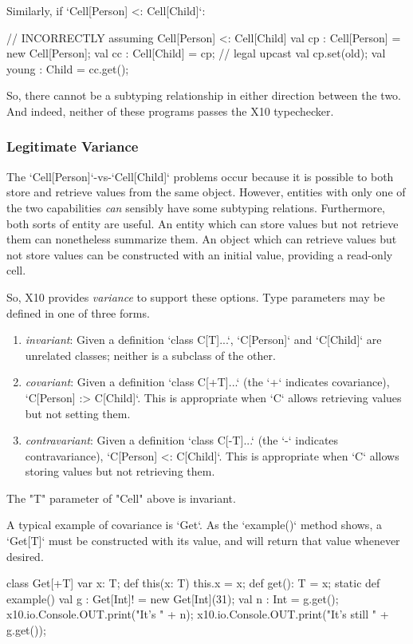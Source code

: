 {Similarly, if \xcd`Cell[Person] <: Cell[Child]`: 
\begin{xten}
// INCORRECTLY assuming Cell[Person] <: Cell[Child]
val cp : Cell[Person] = new Cell[Person];
val cc : Cell[Child] = cp; // legal upcast
val cp.set(old); 
val young : Child = cc.get();
\end{xten}

So, there cannot be a subtyping relationship in either direction between the
two. And indeed, neither of these programs passes the X10 typechecker.


\subsubsection{Legitimate Variance}

The \xcd`Cell[Person]`-vs-\xcd`Cell[Child]` problems occur because it is
possible to both store and retrieve values from the same object. However,
entities with only one of the two capabilities {\em can} sensibly have some
subtyping relations. Furthermore, both sorts of entity are useful. An entity
which can store values but not retrieve them can nonetheless summarize them.
An object which can retrieve values but not store values can be constructed
with an initial value, providing a read-only cell.

So, X10 provides {\em variance} to support these options.  Type parameters
may be defined in one of three forms.  
\begin{enumerate}
\item {\em invariant}: Given a definition \xcd`class C[T]{...}`, \xcd`C[Person]` and
      \xcd`C[Child]` are unrelated classes; neither is a subclass of the
      other.
\item {\em covariant}: Given a definition \xcd`class C[+T]{...}` (the \xcd`+` indicates
      covariance), \xcd`C[Person] :> C[Child]`.  This is appropriate when
      \xcd`C` allows retrieving values but not setting them.
\item {\em contravariant}: Given a definition \xcd`class C[-T]{...}` (the \xcd`-` indicates
      contravariance), \xcd`C[Person] <: C[Child]`.  This is appropriate when
      \xcd`C` allows storing values but not retrieving them.
\end{enumerate}


The \xcd"T" parameter of \xcd"Cell" above is
invariant.  

A typical example of covariance is \xcd`Get`.  As the \xcd`example()` method
shows, a \xcd`Get[T]` must be constructed with its value, and will return that
value whenever desired.
\begin{xten}
class Get[+T] {
  var x: T;
  def this(x: T) { this.x = x; }
  def get(): T = x;
  static def example() {
     val g : Get[Int]! = new Get[Int](31);
     val n : Int = g.get();
     x10.io.Console.OUT.print("It's " + n);
     x10.io.Console.OUT.print("It's still " + g.get());
  }
}
\end{xten}


}
